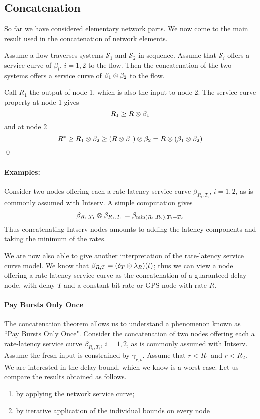\subsection{Concatenation}
So far we have considered elementary network
parts. We now come to the main result used in the concatenation of
network elements.

\begin{theorem}
Assume a flow traverses systems $\mathcal{S}_{1}$ and
$\mathcal{S}_{2}$ in sequence.  Assume that $\mathcal{S}_{i}$
offers a service curve of $\beta_{i}$, $i=1,2$ to the flow. Then
the concatenation of the two systems offers a service curve of
$\beta_{1} \otimes \beta_{2}$ to the flow.
\end{theorem}

\pr Call $R_{1}$ the output of node 1, which is also the input to
node 2. The service curve property at node 1 gives $$ R_{1} \geq R
\otimes \beta_{1}$$ and at node 2 $$R^{*} \geq R_{1} \otimes \beta_{2}
\geq (R \otimes \beta_{1}) \otimes \beta_{2} = R \otimes (\beta_{1} \otimes
\beta_{2})$$ \qed
\paragraph{Examples: }
Consider two nodes offering each a rate-latency service curve
$\beta_{R_i, T_i}$, $i=1,2$, as is commonly assumed with Intserv.
A simple computation gives
 $$\beta_{R_1, T_1} \otimes  \beta_{R_1, T_1} = \beta_{\min(R_1, R_2), T_1+T_2}
 $$
Thus concatenating Intserv nodes amounts to adding the latency
components and taking the minimum of the rates.

We are now also able to give another interpretation of the
rate-latency service curve model. We know that $ \beta_{R,T} =
(\delta_{T} \otimes \lambda_{R})(t)$; thus we can view a node
offering a rate-latency service curve as the concatenation of a
guaranteed delay node, with delay $T$ and a constant bit rate or
GPS node with rate $R$.

\paragraph{Pay Bursts Only Once}

The concatenation theorem allows us to understand a phenomenon
known as ``Pay Bursts Only Once". Consider the concatenation of
two nodes offering each a rate-latency service curve $\beta_{R_i,
T_i}$, $i=1,2$, as is commonly assumed with Intserv. Assume the
fresh input is constrained by $\gamma_{r, b}$. Assume that $r<
R_{1}$ and $r< R_{2}$. We are interested in the delay bound, which
we know is a worst case. Let us compare the results obtained as
follows.
\begin{enumerate}
    \item  by applying the network service curve;
    \item  by iterative application of the individual bounds
    on every node
\end{enumerate}

